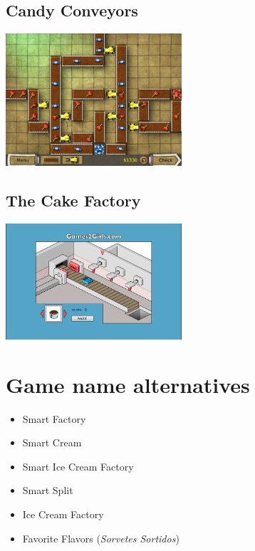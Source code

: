 \documentclass[a4paper]{scrartcl}
\begin{document}
    \begin{multicols}{2}
        \subsection{Candy Conveyors}
            \includegraphics[width=0.49\textwidth]{similar_games/CandyConveyors}

        \subsection{The Cake Factory}
            \includegraphics[width=0.49\textwidth]{similar_games/TheCakeFactory}
    \end{multicols}

\section{Game name alternatives}
    \begin{itemize}
        \item Smart Factory
        \item Smart Cream
        \item Smart Ice Cream Factory
        \item Smart Split
        \item Ice Cream Factory
        \item Favorite Flavors (\textit{Sorvetes Sortidos})
    \end{itemize}
\end{document}
